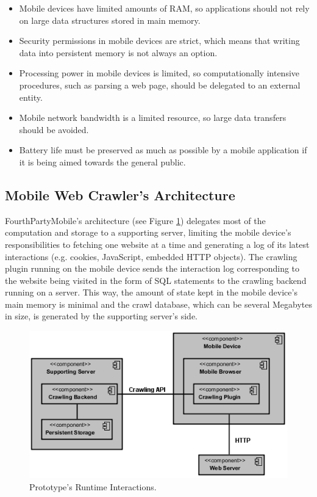 \documentclass{acm_proc_article-sp}
\begin{document}
\begin{itemize}
\item Mobile devices have limited amounts of RAM, so applications should not rely on large data structures stored in main memory.

\item Security permissions in mobile devices are strict, which means that writing data into persistent memory is not always an option.

\item Processing power in mobile devices is limited, so computationally intensive procedures, such as parsing a web page, should be delegated to an external entity.

\item Mobile network bandwidth is a limited resource, so large data transfers should be avoided.

\item Battery life must be preserved as much as possible by a mobile application if it is being aimed towards the general public.
\end{itemize}


\subsection{Mobile Web Crawler's Architecture}

FourthPartyMobile's architecture (see Figure \ref{fig:component_diagram}) delegates most of the computation and storage to a supporting server, limiting the mobile device's responsibilities to fetching one website at a time and generating a log of its latest interactions (e.g. cookies, JavaScript, embedded HTTP objects). The crawling plugin running on the mobile device sends the interaction log corresponding to the website being visited in the form of SQL statements to the crawling backend running on a server. This way, the amount of state kept in the mobile device's main memory is minimal and the crawl database, which can be several Megabytes in size, is generated by the supporting server's side. 

\begin{figure}[h] 
\centering \includegraphics[scale=0.65]{diagrams/component_diagram.png}
\caption{Prototype's Runtime Interactions.}
\label{fig:component_diagram}
\end{figure}
\end{document}
